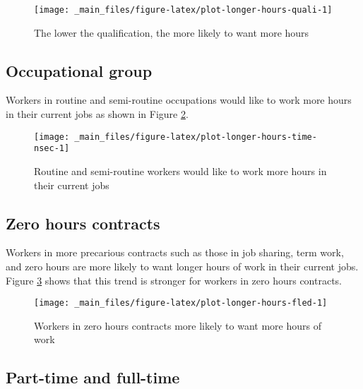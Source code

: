 \documentclass[
]{book}
\begin{document}
\begin{figure}

{\centering \texttt{[image: \_main\_files/figure-latex/plot-longer-hours-quali-1]} 

}

\caption{The lower the qualification, the more likely to want more hours}\label{fig:plot-longer-hours-quali}
\end{figure}

\hypertarget{occupational-group-1}{%
\subsection{Occupational group}\label{occupational-group-1}}

Workers in routine and semi-routine occupations would like to work more hours in their current jobs as shown in Figure \ref{fig:plot-longer-hours-time-nsec}.

\begin{figure}

{\centering \texttt{[image: \_main\_files/figure-latex/plot-longer-hours-time-nsec-1]} 

}

\caption{Routine and semi-routine workers would like to work more hours in their current jobs}\label{fig:plot-longer-hours-time-nsec}
\end{figure}

\hypertarget{zero-hours-contracts}{%
\subsection{Zero hours contracts}\label{zero-hours-contracts}}

Workers in more precarious contracts such as those in job sharing, term work, and zero hours are more likely to want longer hours of work in their current jobs. Figure \ref{fig:plot-longer-hours-fled} shows that this trend is stronger for workers in zero hours contracts.

\begin{figure}

{\centering \texttt{[image: \_main\_files/figure-latex/plot-longer-hours-fled-1]} 

}

\caption{Workers in zero hours contracts more likely to want more hours of work}\label{fig:plot-longer-hours-fled}
\end{figure}

\hypertarget{part-time-and-full-time}{%
\subsection{Part-time and full-time}\label{part-time-and-full-time}}
\end{document}
